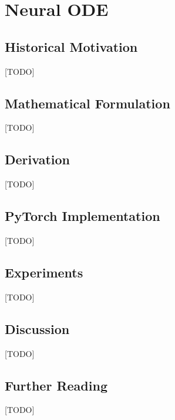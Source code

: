 
\chapter{Neural ODE}
\label{ch:05_neural_ode}


\section{Historical Motivation}
[TODO]

\section{Mathematical Formulation}
[TODO]

\section{Derivation}
[TODO]

\section{PyTorch Implementation}
[TODO]

\section{Experiments}
[TODO]

\section{Discussion}
[TODO]

\section{Further Reading}
[TODO]
